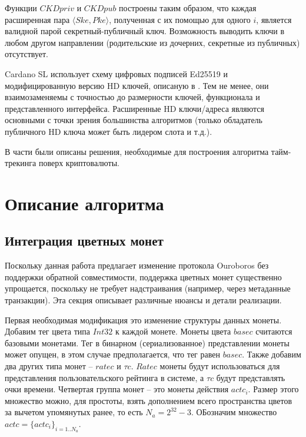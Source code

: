 \documentclass[specification,annotation]{itmo-student-thesis}
\begin{document}
Функции $CKDpriv$ и $CKDpub$ построены таким образом, что каждая
расширенная пара $\langle Ske,Pke \rangle$, полученная с их помощью
для одного $i$, является валидной парой секретный-публичный
ключ. Возможность выводить ключи в любом другом направлении
(родительские из дочерних, секретные из публичных) отсутствует.

Cardano SL использует схему цифровых подписей Ed25519
\cite{bernstein2012high} и модифицированную версию HD ключей, описаную
в \cite{ed25519hd}. Тем не менее, они взаимозаменяемы с точностью до
размерности ключей, функционала и представленного
интерфейса. Расширенные HD ключи/адреса являются основными с точки
зрения большинства алгоритмов (только обладатель публичного HD ключа
может быть лидером слота и т.д.).

\chapterconclusion

В части были описаны решения, необходимые для построения алгоритма
тайм-трекинга поверх криптовалюты.

\chapter{Описание алгоритма}

\section{Интеграция цветных монет}

Поскольку данная работа предлагает изменение протокола Ouroboros без
поддержки обратной совместимости, поддержка цветных монет существенно
упрощается, поскольку не требует надстраивания (например, через
метаданные транзакции). Эта секция описывает различные нюансы и детали
реализации.

Первая необходимая модификация это изменение структуры данных
монеты. Добавим тег цвета типа $Int32$ к каждой монете. Монеты цвета
$basec$ считаются базовыми монетами. Тег в бинарном (сериализованное)
представлении монеты может опущен, в этом случае предполагается, что
тег равен $basec$. Также добавим два других типа монет -- $ratec$ и
$\tau c$. $Ratec$ монеты будут использоваться для представления
пользовательского рейтинга в системе, а $\tau c$ будут представлять
очки времени. Четвертая группа монет -- это монеты действия
$actc_i$. Размер этого множество можно, для простоты, взять
дополнением всего пространства цветов за вычетом упомянутых ранее, то
есть $N_a = 2^{32}-3$. ОБозначим множество $actc = \{actc_i\}_{i=1..N_a}$.
\end{document}
